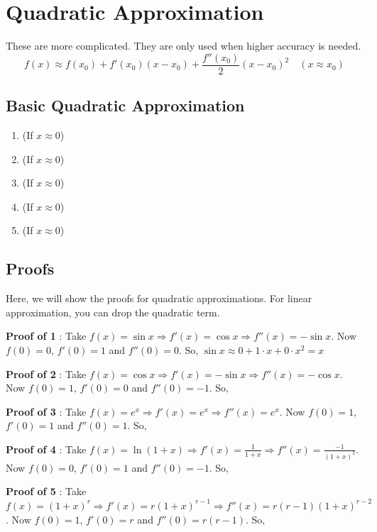 \section{Quadratic Approximation}

These are more complicated. They are only used when higher accuracy is needed.
$$ \boxed{
	f(x) \approx f(x_0) + f'(x_0)(x-x_0) + \frac{f''(x_0)}{2}(x-x_0)^2 \quad (x \approx x_0)
}$$

\subsection{Basic Quadratic Approximation}

\begin{enumerate}
	\item {} (If $x \approx 0$)
	\item {} (If $x \approx 0$)
	\item {} (If $x \approx 0$)
	\item {} (If $x \approx 0$)
	\item {} (If $x \approx 0$)
\end{enumerate}


\subsection*{Proofs}

Here, we will show the proofs for quadratic approximations. 
For linear approximation, you can drop the quadratic term.

{\bf Proof of 1} : Take $ f(x) = \sin x \Rightarrow f'(x) = \cos x \Rightarrow f''(x) = - \sin x $. 
Now $f(0) = 0$, $f'(0) = 1$ and $f''(0) = 0$. 
So, $ \sin x \approx 0 + 1 \cdot x + 0 \cdot x^2 = x $

{\bf Proof of 2} : Take $ f(x) = \cos x \Rightarrow f'(x) = -\sin x \Rightarrow f''(x) = - \cos x $. 
Now $f(0) = 1$, $f'(0) = 0$ and $f''(0) = -1$. 
So,  

{\bf Proof of 3} : Take $ f(x) = e^x \Rightarrow f'(x) = e^x \Rightarrow f''(x) = e^x $. 
Now $f(0) = 1$, $f'(0) = 1$ and $f''(0) = 1$. 
So,  

{\bf Proof of 4} : Take $ f(x) = \ln(1+x) \Rightarrow f'(x) = \frac{1}{1+x} \Rightarrow f''(x) = \frac{-1}{(1+x)^2} $. 
Now $f(0) = 0$, $f'(0) = 1$ and $f''(0) = -1$. 
So,  

{\bf Proof of 5} : Take $ f(x) = (1+x)^r \Rightarrow f'(x) = r(1+x)^{r-1} \Rightarrow f''(x) = r(r-1)(1+x)^{r-2} $. 
Now $f(0) = 1$, $f'(0) = r$ and $f''(0) = r(r-1)$. 
So, 


